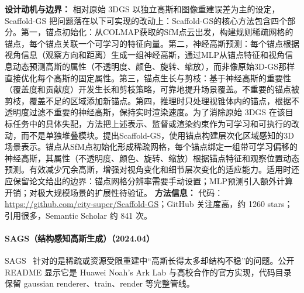 \textbf{设计动机与边界：} 相对原始 3DGS 以独立高斯和图像重建误差为主的设定，Scaffold-GS 把问题落在以下可实现的改动上：Scaffold-GS的核心方法包含四个部分。第一，锚点初始化：从COLMAP获取的SfM点云出发，构建规则稀疏网格的锚点，每个锚点关联一个可学习的特征向量。第二，神经高斯预测：每个锚点根据视角信息（观察方向和距离）生成一组神经高斯，通过MLP从锚点特征和视角信息动态预测高斯的属性（不透明度、颜色、旋转、缩放），而非像原始3D-GS那样直接优化每个高斯的固定属性。第三，锚点生长与剪枝：基于神经高斯的重要性（覆盖度和贡献度）开发生长和剪枝策略，可靠地提升场景覆盖。不重要的锚点被剪枝，覆盖不足的区域添加新锚点。第四，推理时只处理视锥体内的锚点，根据不透明度过滤不重要的神经高斯，保持实时渲染速度。为了消除原始 3DGS 在该目标任务中的具体失配，方法把上述表示、监督或渲染约束作为可学习和可执行的改动，而不是单独堆叠模块。提出Scaffold-GS，使用锚点构建层次化区域感知的3D场景表示。锚点从SfM点初始化形成稀疏网格，每个锚点绑定一组带可学习偏移的神经高斯，其属性（不透明度、颜色、旋转、缩放）根据锚点特征和观察位置动态预测。有效减少冗余高斯，增强对视角变化和细节层次变化的适应能力。适用时还应保留论文给出的边界：锚点网格分辨率需要手动设置；MLP预测引入额外计算开销；对极大规模场景的扩展性待验证。
\textbf{方法信息：} 代码：\url{https://github.com/city-super/Scaffold-GS}；GitHub 关注度高，约 1260 stars；引用很多，Semantic Scholar 约 841 次。



\paragraph{SAGS（结构感知高斯生成）（2024.04）}
SAGS~\cite{2404_19149} 针对的是稀疏或资源受限重建中“高斯长得太多却结构不稳”的问题。公开 README 显示它是 Huawei Noah's Ark Lab 与高校合作的官方实现，代码目录保留 gaussian renderer、train、render 等完整管线。

